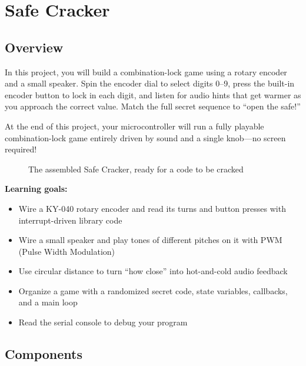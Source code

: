 \chapter{Safe Cracker}

\section{Overview}
In this project, you will build a combination-lock game using a rotary encoder and a small speaker.
Spin the encoder dial to select digits 0--9, press the built-in encoder button to lock in each digit,
and listen for audio hints that get warmer as you approach the correct value. Match the full secret
sequence to ``open the safe!''

At the end of this project, your microcontroller will run a fully playable combination-lock game
entirely driven by sound and a single knob—no screen required!

\begin{figure}[H]
\centering
    \caption{The assembled Safe Cracker, ready for a code to be cracked}
\end{figure}

\begin{tcolorbox}[colback=blue!5!white,colframe=blue!40!black]
    \textbf{Learning goals:}
    \begin{itemize}
        \item Wire a KY-040 rotary encoder and read its turns and button presses with interrupt-driven
              library code
        \item Wire a small speaker and play tones of different pitches on it with PWM (Pulse Width
              Modulation)
        \item Use circular distance to turn ``how close'' into hot-and-cold audio feedback
        \item Organize a game with a randomized secret code, state variables, callbacks, and a main loop
        \item Read the serial console to debug your program
    \end{itemize}
\end{tcolorbox}

\pagebreak

\section{Components}

